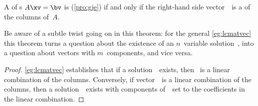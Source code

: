 \begin{theorem} \label{thm:conlincom} 
A  of s \(A\xv=\bv\) is  (\cref{pro:gje}) 
if and only if the right-hand side vector~\bv\ is a  of the columns of~\(A\).
\end{theorem}

Be aware of a subtle twist going on in this theorem: for the general \cref{eg:lcmatvec} this theorem turns a question about the existence of an \(n\)~variable solution~\xv, into a question about vectors with \(m\)~components, and vice versa.

\begin{proof} 
\cref{eg:lcmatvec} establishes that if a solution~\xv\ exists, then \bv~is a linear combination of the columns.
Conversely, if vector~\bv\ is a linear combination of the columns, then a solution~\xv\ exists with components of~\xv\ set to the coefficients in the linear combination.
\end{proof}


